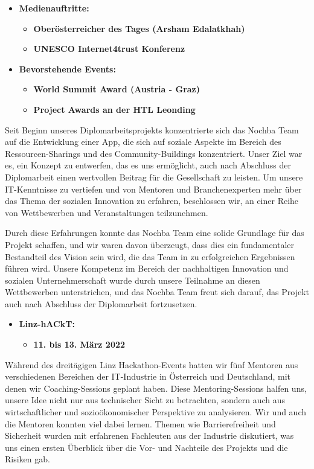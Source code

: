\begin{itemize}
\begin{itemize}
    \end{itemize}
    \item \textbf{Medienauftritte:}
    \begin{itemize}
        \item \textbf{Oberösterreicher des Tages (Arsham Edalatkhah)}
        \item \textbf{UNESCO Internet4trust Konferenz}
    \end{itemize}
    \item \textbf{Bevorstehende Events:}
    \begin{itemize}
        \item \textbf{World Summit Award (Austria - Graz)}
        \item \textbf{Project Awards an der HTL Leonding}
    \end{itemize}
\end{itemize}

Seit Beginn unseres Diplomarbeitsprojekts konzentrierte sich das Nochba Team auf die Entwicklung einer App, die sich auf soziale Aspekte im Bereich des Ressourcen-Sharings und des Community-Buildings konzentriert. Unser Ziel war es, ein Konzept zu entwerfen, das es uns ermöglicht, auch nach Abschluss der Diplomarbeit einen wertvollen Beitrag für die Gesellschaft zu leisten. Um unsere IT-Kenntnisse zu vertiefen und von Mentoren und Branchenexperten mehr über das Thema der sozialen Innovation zu erfahren, beschlossen wir, an einer Reihe von Wettbewerben und Veranstaltungen teilzunehmen. 

Durch diese Erfahrungen konnte das Nochba Team eine solide Grundlage für das Projekt schaffen, und wir waren davon überzeugt, dass dies ein fundamentaler Bestandteil des Vision sein wird, die das Team in zu erfolgreichen Ergebnissen führen wird. Unsere Kompetenz im Bereich der nachhaltigen Innovation und sozialen Unternehmerschaft wurde durch unsere Teilnahme an diesen Wettbewerben unterstrichen, und das Nochba Team freut sich darauf, das Projekt auch nach Abschluss der Diplomarbeit fortzusetzen.

\begin{itemize}
    \item \textbf{Linz-hACkT:}
    \begin{itemize}
        \item \textbf{11. bis 13. März 2022}
    \end{itemize}
\end{itemize}

Während des dreitägigen Linz Hackathon-Events hatten wir fünf Mentoren aus verschiedenen Bereichen der IT-Industrie in Österreich und Deutschland, mit denen wir Coaching-Sessions geplant haben. Diese Mentoring-Sessions halfen uns, unsere Idee nicht nur aus technischer Sicht zu betrachten, sondern auch aus wirtschaftlicher und sozioökonomischer Perspektive zu analysieren. Wir und auch die Mentoren konnten viel dabei lernen. Themen wie Barrierefreiheit und Sicherheit wurden mit erfahrenen Fachleuten aus der Industrie diskutiert, was uns einen ersten Überblick über die Vor- und Nachteile des Projekts und die Risiken gab.

